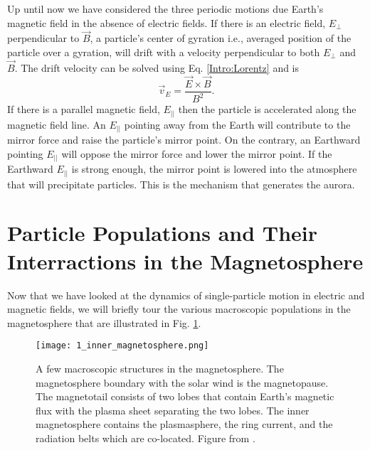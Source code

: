 Up until now we have considered the three periodic motions due Earth's magnetic field in the absence of electric fields. If there is an electric field, $E_\perp$ perpendicular to $\vec{B}$, a particle's center of gyration i.e., averaged position of the particle over a gyration, will drift with a velocity perpendicular to both $E_\perp$ and $\vec{B}$. The drift velocity can be solved using Eq. \ref{Intro:Lorentz} and is
\begin{equation}
\vec{v}_E = \frac{\vec{E} \times \vec{B}}{B^2}.
\end{equation} If there is a parallel magnetic field, $E_{||}$ then the particle is accelerated along the magnetic field line. An $E_{||}$  pointing away from the Earth will contribute to the mirror force and raise the particle's mirror point. On the contrary, an Earthward pointing $E_{||}$ will oppose the mirror force and lower the mirror point. If the Earthward $E_{||}$ is strong enough, the mirror point is lowered into the atmosphere that will precipitate particles. This is the mechanism that generates the aurora.
        
\section{Particle Populations and Their Interractions in the Magnetosphere}\label{ntro:particle_populations}
Now that we have looked at the dynamics of single-particle motion in electric and magnetic fields, we will briefly tour the various macroscopic populations in the magnetosphere that are illustrated in Fig. \ref{Intro:inner_magnetosphere}.

\begin{figure}
\texttt{[image: 1\_inner\_magnetosphere.png]}
\caption{A few macroscopic structures in the magnetosphere. The magnetosphere boundary with the solar wind is the magnetopause. The magnetotail consists of two lobes that contain Earth's magnetic flux with the plasma sheet separating the two lobes. The inner magnetosphere contains the plasmasphere, the ring current, and the radiation belts which are co-located. Figure from \citet{Baumjohann1997}.}
\label{Intro:inner_magnetosphere}
\end{figure}

